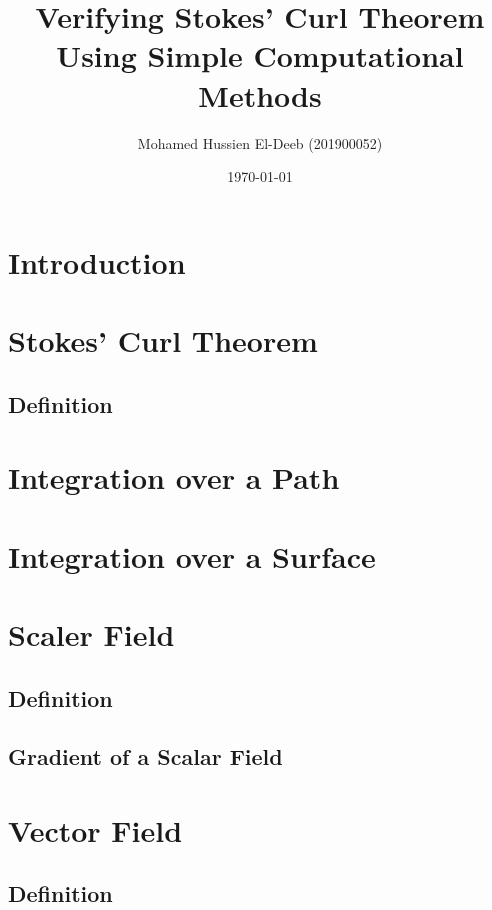 \documentclass[12pt]{article}
\title{Verifying Stokes' Curl Theorem Using Simple Computational Methods}
\author{Mohamed Hussien El-Deeb (201900052)}
\date{\today}
\begin{document}
\maketitle
\tableofcontents
\hypersetup{linkcolor=RoyalBlue4}

\newpage
\section{Introduction}



\newpage
\section{Stokes' Curl Theorem}
\subsection{Definition}



\newpage
\section{Integration over a Path}



\newpage
\section{Integration over a Surface}



\newpage
\section{Scaler Field}
\subsection{Definition}



\subsection{Gradient of a Scalar Field}



\newpage
\section{Vector Field}
\subsection{Definition}
\end{document}

